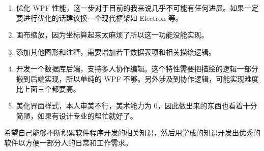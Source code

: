 \begin{enumerate}
  \item 优化 WPF 性能，这一步对于目前的我来说几乎不可能有任何进展。如果一定要进行优化的话建议换一个现代框架如 Electron 等。
  \item 画布缩放，因为坐标算起来太麻烦了所以这一功能没能实现。
  \item 添加其他图形和注释，需要增加若干数据表项和相关描绘逻辑。
  \item 开发一个数据库后端，支持多人协作编辑。这个特性需要把描绘的逻辑一部分搬到后端实现，所以单纯的 WPF 不够。另外涉及到协作逻辑，可能实现难度比上面三个都要高。
  \item 美化界面样式，本人审美不行，美术能力为 0，因此做出来的东西也看着十分简陋，如果有设计专业的帮忙就好了。
\end{enumerate}

希望自己能够不断积累软件程序开发的相关知识，然后用学成的知识开发出优秀的软件以方便一部分人的日常和工作需求。
